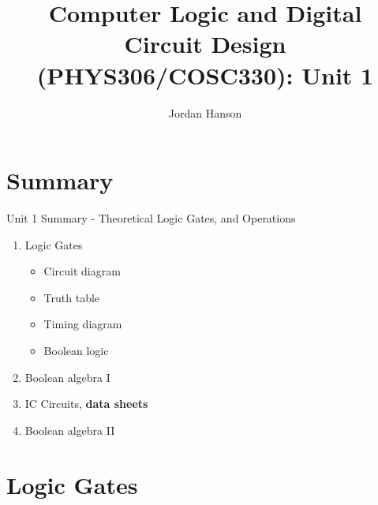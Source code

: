 \documentclass{beamer}
\title{Computer Logic and Digital Circuit Design (PHYS306/COSC330): Unit 1}
\author{Jordan Hanson}
\institute{Whittier College Department of Physics and Astronomy}
\begin{document}
\maketitle

\section{Summary}

\begin{frame}{Unit 1 Summary - Theoretical Logic Gates, and Operations}
\begin{enumerate}
\item Logic Gates
\begin{itemize}
\item Circuit diagram
\item Truth table
\item Timing diagram
\item Boolean logic
\end{itemize}
\item \alert{Boolean algebra I}
\item IC Circuits, \textbf{data sheets}
\item \alert{Boolean algebra II}
\end{enumerate}
\end{frame}

\section{Logic Gates}
\end{document}
